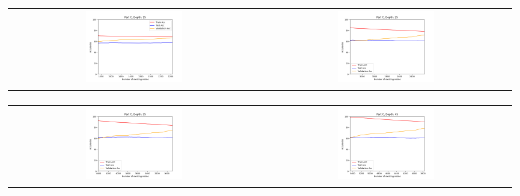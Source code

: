 \begin{enumerate}[label=(\alph*)]
          \begin{center}
              \begin{center}
                  \begin{tabular}{c c}
                      \includegraphics[width=0.40\textwidth]{./images/q1_part_c_depth15.png} & \includegraphics[width=0.40\textwidth]{./images/q1_part_c_depth25.png}
                  \end{tabular}
                  \begin{tabular}{c c}
                      \includegraphics[width=0.40\textwidth]{./images/q1_part_c_depth35.png} & \includegraphics[width=0.40\textwidth]{./images/q1_part_c_depth45.png}
                  \end{tabular}
              \end{center}
          \end{center}


\end{enumerate}
